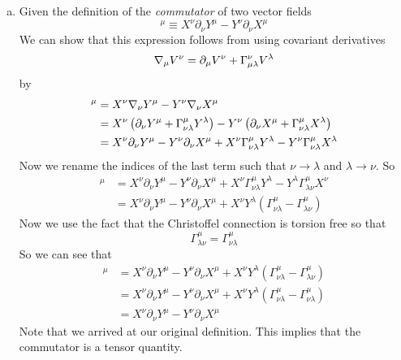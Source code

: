 \documentclass[11pt]{article}
\numberwithin{equation}{section}
\begin{document}
\begin{enumerate}[(a)]
\item
Given the definition of the \emph{commutator} of two vector fields
\begin{equation}
[X,Y]^{\mu} \equiv X^{\nu}\partial_{\nu}Y^{\mu} - Y^{\nu}\partial_{\nu}X^{\mu}
\label{commut}
\end{equation}
We can show that this expression follows from using covariant derivatives
$$\bold\nabla_{\mu}V^{\nu} = \partial_{\mu}V^{\nu} + \Gamma^{\nu}_{\mu\lambda}V^{\lambda}$$
by
\begin{align*}
[X,Y]^{\mu} &= X^{\nu}\grad_{\nu}Y^{\mu} - Y^{\nu}\grad_{\nu}X^{\mu}\\
&= X^{\nu}\left(\partial_{\nu}Y^{\mu} + \Gamma^{\mu}_{\nu\lambda}Y^{\lambda}\right) - Y^{\nu}\left(\partial_{\nu}X^{\mu}+ \Gamma^{\mu}_{\nu\lambda}X^{\lambda}\right) \\
&= X^{\nu}\partial_{\nu}Y^{\mu} - Y^{\nu}\partial_{\nu}X^{\mu} + X^{\nu}\Gamma^{\mu}_{\nu\lambda}Y^{\lambda} - Y^{\nu}\Gamma^{\mu}_{\nu\lambda}X^{\lambda} 
\end{align*}
Now we rename the indices of the last term such that $\nu\rightarrow\lambda$ and $\lambda\rightarrow\nu$. So
\begin{align*}
[X,Y]^{\mu} &= X^{\nu}\partial_{\nu}Y^{\mu} - Y^{\nu}\partial_{\nu}X^{\mu} + X^{\nu}\Gamma^{\mu}_{\nu\lambda}Y^{\lambda} - Y^{\lambda}\Gamma^{\mu}_{\lambda\nu}X^{\nu} \\
&= X^{\nu}\partial_{\nu}Y^{\mu} - Y^{\nu}\partial_{\nu}X^{\mu} + X^{\nu}Y^{\lambda}\left(\Gamma^{\mu}_{\nu\lambda} - \Gamma^{\mu}_{\lambda\nu}\right)
\end{align*}
Now we use the fact that the Christoffel connection is torsion free so that
$$\Gamma^{\mu}_{\lambda\nu} = \Gamma^{\mu}_{\nu\lambda}$$
So we can see that
\begin{align*}
[X,Y]^{\mu} &= X^{\nu}\partial_{\nu}Y^{\mu} - Y^{\nu}\partial_{\nu}X^{\mu} + X^{\nu}Y^{\lambda}\left(\Gamma^{\mu}_{\nu\lambda} - \Gamma^{\mu}_{\lambda\nu}\right)\\
&= X^{\nu}\partial_{\nu}Y^{\mu} - Y^{\nu}\partial_{\nu}X^{\mu} + X^{\nu}Y^{\lambda}\left(\Gamma^{\mu}_{\nu\lambda} - \Gamma^{\mu}_{\nu\lambda}\right)\\
&= X^{\nu}\partial_{\nu}Y^{\mu} - Y^{\nu}\partial_{\nu}X^{\mu} 
\end{align*}
Note that we arrived at our original definition. This implies that the commutator is a tensor quantity.


\end{enumerate}
\end{document}
